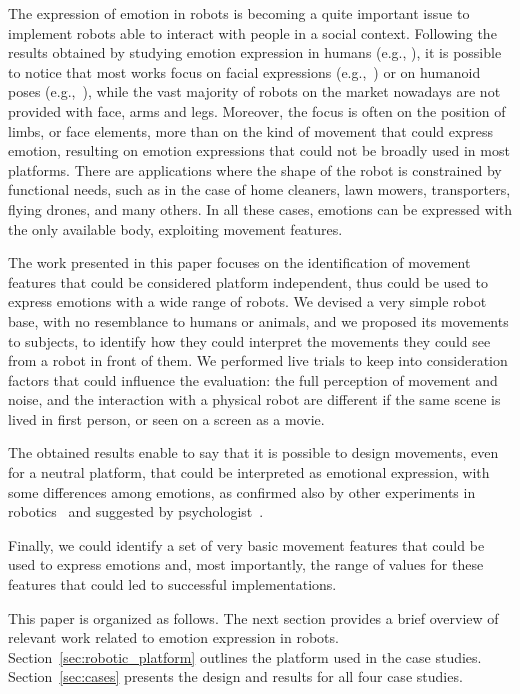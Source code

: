 The expression of emotion in robots is becoming a quite important issue to implement robots able to interact with people in a social context. Following the results obtained by studying emotion expression in humans (e.g., \cite{Venture2014,Ekman2004}), it is possible to notice that most works focus on facial expressions (e.g.,~\cite{Breazeal2002}) or on humanoid poses (e.g.,~\cite{Canamero2010}), while the vast majority of robots on the market nowadays are not provided with face, arms and legs. Moreover, the focus is often on the position of limbs, or face elements, more than on the kind of movement that could express emotion, resulting on emotion expressions that could not be broadly used in most platforms.
There are applications where the shape of the robot is constrained by functional needs, such as in the case of home cleaners, lawn mowers, transporters, flying drones, and many others. In all these cases, emotions can be expressed with the only available body, exploiting movement features.

The work presented in this paper focuses on the identification of movement features that could be considered platform independent, thus could be used to express emotions with a wide range of robots. We devised a very simple robot base, with no resemblance to humans or animals, and we proposed its movements to subjects, to identify how they could interpret the movements they could see from a robot in front of them. We performed live trials to keep into consideration factors that could influence the evaluation: the full perception of movement and noise, and the interaction with a physical robot are different if the same scene is lived in first person, or seen on a screen as a movie.

The obtained results enable to say that it is possible to design movements, even for a neutral platform, that could be interpreted as emotional expression, with some differences among emotions, as confirmed also by other experiments in robotics~\cite{Sharma2013} and suggested by psychologist~\cite{Russell2003}.

Finally, we could identify a set of very basic movement features that could be used to express emotions and, most importantly, the range of values for these features that could led to successful implementations.

This paper is organized as follows. The next section provides a brief overview of relevant work related to emotion expression in robots. Section~\ref{sec:robotic_platform} outlines the platform used in the case studies. Section~\ref{sec:cases} presents the design and results for all four case studies.